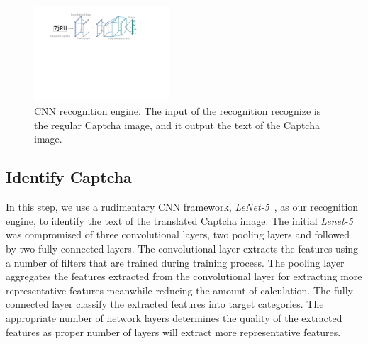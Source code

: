 %

\begin{figure}[!t]
  \centering
  \includegraphics[width=0.45\textwidth]{fig/cnn_model.pdf}
  \caption{CNN recognition engine. The input of the recognition recognize is the regular Captcha image, and it output the text of the Captcha image.}
  \label{fig: cnn_model}
\end{figure}

\subsection{Identify Captcha}
In this step, we use a rudimentary CNN framework, \emph{LeNet-5}~\cite{Lecun1998Gradient}, as our recognition engine, to identify the text of the translated Captcha image.
The initial \emph{Lenet-5} was compromised of three convolutional layers, two pooling layers and followed by two fully connected layers.
The convolutional layer extracts the features using a number of filters that are trained during training process. The pooling layer aggregates the features extracted from the convolutional layer for extracting more representative features meanwhile reducing the amount of calculation. The fully connected layer classify the extracted features into target categories. The appropriate number of network layers determines the quality of the extracted features as proper number of layers will extract more representative features.

